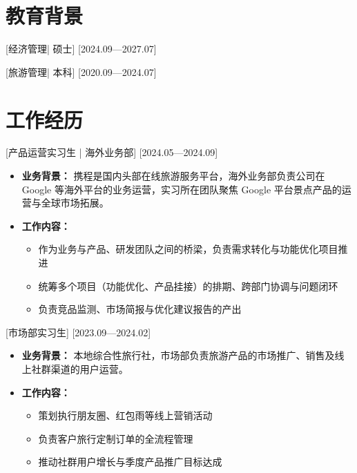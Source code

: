 \documentclass{resume}
\begin{document}

\ResumeTitle

\section{教育背景}

[\textnormal{经济管理|} 硕士]
[2024.09—2027.07]

[\textnormal{旅游管理|} 本科]
[2020.09—2024.07]

\section{工作经历}

[\textnormal{产品运营实习生 |} 海外业务部]
[2024.05—2024.09]

\begin{itemize}

\item \textbf{业务背景：} 携程是国内头部在线旅游服务平台，海外业务部负责公司在 Google 等海外平台的业务运营，实习所在团队聚焦 Google 平台景点产品的运营与全球市场拓展。

\item \textbf{工作内容：}
\begin{itemize}
  \item 作为业务与产品、研发团队之间的桥梁，负责需求转化与功能优化项目推进
  \item 统筹多个项目（功能优化、产品挂接）的排期、跨部门协调与问题闭环
  \item 负责竞品监测、市场简报与优化建议报告的产出
\end{itemize}

\end{itemize}

[\textnormal{市场部实习生}]
[2023.09—2024.02]

\begin{itemize}

\item \textbf{业务背景：} 本地综合性旅行社，市场部负责旅游产品的市场推广、销售及线上社群渠道的用户运营。

\item \textbf{工作内容：}
\begin{itemize}
  \item 策划执行朋友圈、红包雨等线上营销活动
  \item 负责客户旅行定制订单的全流程管理
  \item 推动社群用户增长与季度产品推广目标达成
\end{itemize}

\end{itemize}
\end{document}
